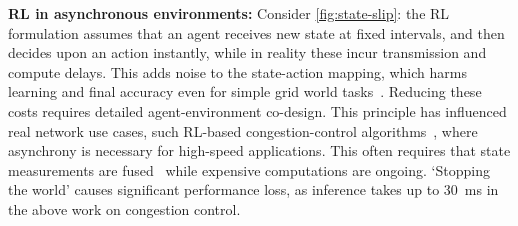 \documentclass[
conference
,10pt
]{IEEEtran}
\newcommand{\fakepara}[1]{\noindent\textbf{#1:}}
\begin{document}

\fakepara{RL in asynchronous environments}
Consider \cref{fig:state-slip}: the RL formulation assumes that an agent receives new state at fixed intervals, and then decides upon an action instantly, while in reality these incur transmission and compute delays.
This adds noise to the state-action mapping, which harms learning and final accuracy even for simple grid world tasks~\parencite{DBLP:journals/firai/TravnikMSP18}.
Reducing these costs requires detailed agent-environment co-design.
This principle has influenced real network use cases, such RL-based congestion-control algorithms~\parencite{DBLP:journals/corr/abs-1910-04054}, where asynchrony is necessary for high-speed applications.
This often requires that state measurements are fused~\parencite{DBLP:journals/corr/abs-1910-04054,DBLP:journals/tnsm/SimpsonRP20} while expensive computations are ongoing.
`Stopping the world' causes significant performance loss, as inference takes up to \SI{30}{\milli\second} in the above work on congestion control.
\end{document}
